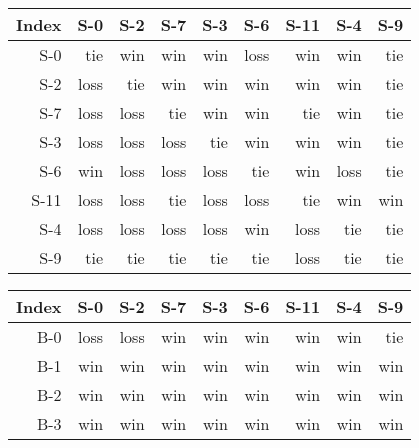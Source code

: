 \begin{tabular}{ | r | r | r | r | r | r | r | r | r | }
    \hline
        Index  &    S-0  &    S-2  &    S-7  &    S-3  &    S-6  &   S-11  &    S-4  &    S-9  \\
    \hline
    \hline
          S-0  &    tie  &    win  &    win  &    win  &   loss  &    win  &    win  &    tie  \\
    \hline
          S-2  &   loss  &    tie  &    win  &    win  &    win  &    win  &    win  &    tie  \\
    \hline
          S-7  &   loss  &   loss  &    tie  &    win  &    win  &    tie  &    win  &    tie  \\
    \hline
          S-3  &   loss  &   loss  &   loss  &    tie  &    win  &    win  &    win  &    tie  \\
    \hline
          S-6  &    win  &   loss  &   loss  &   loss  &    tie  &    win  &   loss  &    tie  \\
    \hline
         S-11  &   loss  &   loss  &    tie  &   loss  &   loss  &    tie  &    win  &    win  \\
    \hline
          S-4  &   loss  &   loss  &   loss  &   loss  &    win  &   loss  &    tie  &    tie  \\
    \hline
          S-9  &    tie  &    tie  &    tie  &    tie  &    tie  &   loss  &    tie  &    tie  \\
    \hline
\end{tabular}


\begin{tabular}{ | r | r | r | r | r | r | r | r | r | }
    \hline
        Index  &    S-0  &    S-2  &    S-7  &    S-3  &    S-6  &   S-11  &    S-4  &    S-9  \\
    \hline
    \hline
          B-0  &   loss  &   loss  &    win  &    win  &    win  &    win  &    win  &    tie  \\
    \hline
          B-1  &    win  &    win  &    win  &    win  &    win  &    win  &    win  &    win  \\
    \hline
          B-2  &    win  &    win  &    win  &    win  &    win  &    win  &    win  &    win  \\
    \hline
          B-3  &    win  &    win  &    win  &    win  &    win  &    win  &    win  &    win  \\
    \hline
\end{tabular}




